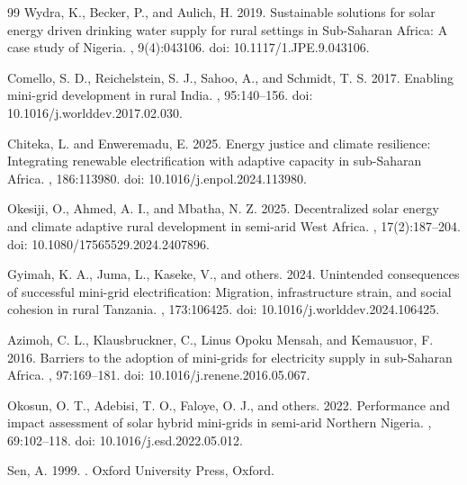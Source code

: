 \documentclass[12pt,a4paper]{article}
\begin{document}
\begin{thebibliography}{99}
Wydra, K., Becker, P., and Aulich, H. 2019.
\newblock Sustainable solutions for solar energy driven drinking water supply for rural settings in {S}ub-{S}aharan {A}frica: {A} case study of {N}igeria.
, 9(4):043106.
\newblock doi: 10.1117/1.JPE.9.043106.

Comello, S. D., Reichelstein, S. J., Sahoo, A., and Schmidt, T. S. 2017.
\newblock Enabling mini-grid development in rural {I}ndia.
, 95:140--156.
\newblock doi: 10.1016/j.worlddev.2017.02.030.

Chiteka, L. and Enweremadu, E. 2025.
\newblock Energy justice and climate resilience: {I}ntegrating renewable electrification with adaptive capacity in sub-{S}aharan {A}frica.
, 186:113980.
\newblock doi: 10.1016/j.enpol.2024.113980.

Okesiji, O., Ahmed, A. I., and Mbatha, N. Z. 2025.
\newblock Decentralized solar energy and climate adaptive rural development in semi-arid {W}est {A}frica.
, 17(2):187--204.
\newblock doi: 10.1080/17565529.2024.2407896.

Gyimah, K. A., Juma, L., Kaseke, V., and others. 2024.
\newblock Unintended consequences of successful mini-grid electrification: {M}igration, infrastructure strain, and social cohesion in rural {T}anzania.
, 173:106425.
\newblock doi: 10.1016/j.worlddev.2024.106425.

Azimoh, C. L., Klausbruckner, C., Linus Opoku Mensah, and Kemausuor, F. 2016.
\newblock Barriers to the adoption of mini-grids for electricity supply in sub-{S}aharan {A}frica.
, 97:169--181.
\newblock doi: 10.1016/j.renene.2016.05.067.

Okosun, O. T., Adebisi, T. O., Faloye, O. J., and others. 2022.
\newblock Performance and impact assessment of solar hybrid mini-grids in semi-arid {N}orthern {N}igeria.
, 69:102--118.
\newblock doi: 10.1016/j.esd.2022.05.012.

Sen, A. 1999.
.
\newblock Oxford University Press, Oxford.


\end{thebibliography}
\end{document}

